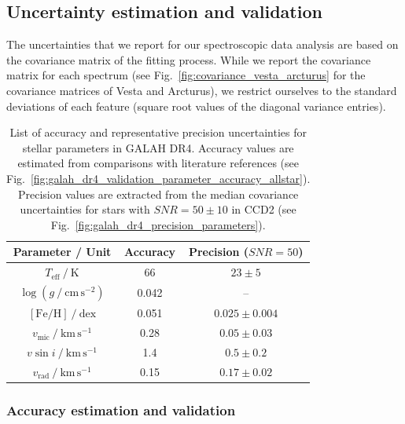 \documentclass[
  journal=pasa,
  manuscript=research-paper, %
  year=2024,
  volume=37
]{cup-journal}
\begin{document}
\subsection{Uncertainty estimation and validation}
\label{sec:uncertainty}

The uncertainties that we report for our spectroscopic data analysis are based on the covariance matrix of the fitting process. While we report the covariance matrix for each spectrum (see Fig.~\ref{fig:covariance_vesta_arcturus} for the covariance matrices of Vesta and Arcturus), we restrict ourselves to the standard deviations of each feature (square root values of the diagonal variance entries).

\begin{table}
\centering
\caption{List of accuracy and representative precision uncertainties for stellar parameters in GALAH DR4. Accuracy values are estimated from comparisons with literature references (see Fig.~\ref{fig:galah_dr4_validation_parameter_accuracy_allstar}). Precision values are extracted from the median covariance uncertainties for stars with $SNR = 50 \pm 10$ in CCD2 (see Fig.~\ref{fig:galah_dr4_precision_parameters}).}
\label{tab:accuracy_precision}
\begin{tabular}{ccc}
\hline \hline
Parameter / Unit & Accuracy & Precision ($SNR = 50$)\\
\hline
$T_\text{eff}~/~\mathrm{K}$          & 66     & $23 \pm 5$ \\
$\log (g~/~\mathrm{cm\,s^{-2}})$     &  0.042 & -- \\
$\mathrm{[Fe/H]}~/~\mathrm{dex}$     &  0.051 & $0.025 \pm 0.004$ \\
$v_\text{mic}~/~\mathrm{km\,s^{-1}}$ &  0.28  & $0.05 \pm 0.03$ \\
$v \sin i~/~\mathrm{km\,s^{-1}}$     &  1.4   & $0.5 \pm 0.2$ \\
$v_\text{rad}~/~\mathrm{km\,s^{-1}}$ &  0.15  & $0.17 \pm 0.02$ \\
\hline
\end{tabular}
\end{table}

\subsubsection{Accuracy estimation and validation} \label{sec:uncertainty_accuracy}
\end{document}
